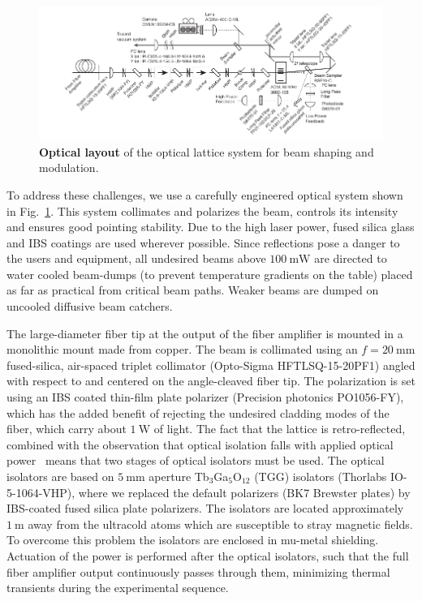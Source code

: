 \documentclass[twocolumn,aps,pra,showpacs,preprintnumbers,bibnotes]{revtex4-1}
\newcommand\unit[2]{\ensuremath{#1~\mathrm{{#2}}}}
\begin{document}
\begin{figure}[t]
  \begin{center}
    \includegraphics{Figure3.pdf}
    \caption{\textbf{Optical layout} of the optical lattice system for beam shaping and modulation.}\label{fig:optical_layout}
  \end{center}
\end{figure}

To address these challenges, we use a carefully engineered optical system shown in Fig.~\ref{fig:optical_layout}.
This system collimates and polarizes the beam, controls its intensity and ensures good pointing stability.
Due to the high laser power, fused silica glass and IBS coatings are used wherever possible.
Since reflections pose a danger to the users and equipment, all undesired beams above \unit{100}{mW} are directed to water cooled beam-dumps (to prevent temperature gradients on the table) placed as far as practical from critical beam paths.
Weaker beams are dumped on uncooled diffusive beam catchers.

The large-diameter fiber tip at the output of the fiber amplifier is mounted in a monolithic mount made from copper.
The beam is collimated using an $f=\unit{20}{mm}$ fused-silica, air-spaced triplet collimator (Opto-Sigma HFTLSQ-15-20PF1) angled with respect to and centered on the angle-cleaved fiber tip.
The polarization is set using an IBS coated thin-film plate polarizer (Precision photonics PO1056-FY), which has the added benefit of rejecting the undesired cladding modes of the fiber, which carry about \unit{1}{W} of light.
The fact that the lattice is retro-reflected, combined with the observation that optical isolation falls with applied optical power~\cite{Yoshida1999} means that two stages of optical isolators must be used.
The optical isolators are based on \unit{5}{mm} aperture Tb$_3$Ga$_5$O$_12$ (TGG) isolators (Thorlabs IO-5-1064-VHP), where we replaced the default polarizers (BK7 Brewster plates) by IBS-coated fused silica plate polarizers.
The isolators are located approximately \unit{1}{m} away from the ultracold atoms which are susceptible to stray magnetic fields.
To overcome this problem the isolators are enclosed in mu-metal shielding.
Actuation of the power is performed after the optical isolators, such that the full fiber amplifier output continuously passes through them, minimizing thermal transients during the experimental sequence.
\end{document}
